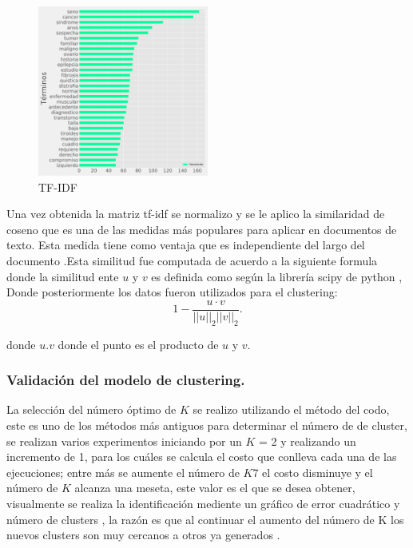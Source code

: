 \begin{figure}[H] 
	\centering
	\includegraphics[width=0.5\textwidth]{Kap4/tfidf.pdf}
	\caption{TF-IDF} 
	\label{fig:IDFTF}
\end{figure}

Una vez obtenida la matriz tf-idf se normalizo y se le aplico la similaridad de coseno que es una de las medidas más populares para aplicar en documentos de texto. Esta medida tiene como ventaja que es independiente del largo del documento \cite{Huang2008}.Esta similitud fue computada de acuerdo a la siguiente formula donde la similitud ente $u$  y $v$ es definida como  según la librería scipy de python \cite{scipy}, Donde posteriormente los datos fueron utilizados para el clustering:
$$   1 - \frac{u \cdot v}
{||u||_2 ||v||_2}. $$

donde $u.v$ donde el punto es el producto de $u$ y $v$.

\subsubsection{Validación del modelo de clustering.}

La selección del número óptimo de $K$ se realizo utilizando el método del codo, este es uno de los métodos más antiguos para determinar el número de de cluster, se realizan varios experimentos iniciando por un $K$ = 2 y realizando un incremento de 1, para los cuáles se calcula el costo que conlleva cada una de las ejecuciones; entre más se aumente el número de $K7$ el costo disminuye y el número de $K$ alcanza una meseta, este valor es el que se desea obtener, visualmente se realiza la identificación mediente un gráfico de error cuadrático y número de clusters , la razón es que al continuar el aumento del número de K los nuevos clusters son muy cercanos a otros ya generados \cite{Kodinariya2013}.\\   

